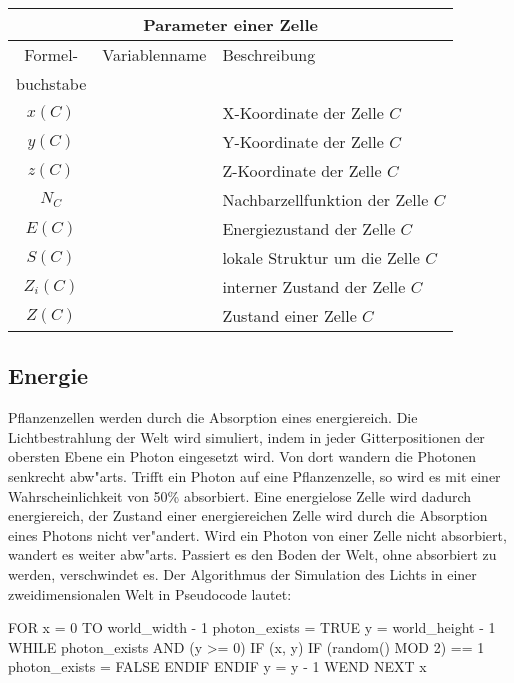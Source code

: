 \medskip
\noindent\begin{tabularx}{\linewidth}{|c|l|X|} \hline
\multicolumn{3}{|c|}{\bfseries Parameter einer Zelle} \\ \hline
Formel- & Variablenname   & Beschreibung \\
buchstabe &               & \\ \hline
$x(C)$    & & X-Koordinate der Zelle $C$ \\
$y(C)$    & & Y-Koordinate der Zelle $C$ \\
$z(C)$    & & Z-Koordinate der Zelle $C$ \\
$N_C$     & & Nachbarzellfunktion der Zelle $C$ \\
$E(C)$    & & Energiezustand der Zelle $C$ \\
$S(C)$    & & lokale Struktur um die Zelle $C$ \\
$Z_i(C)$  & & interner Zustand der Zelle $C$ \\
$Z(C)$    & & Zustand einer Zelle $C$ \\ \hline
\end{tabularx}
\medskip


\subsection{Energie}
\label{energydef}

Pflanzenzellen werden durch die Absorption eines  energiereich.
Die Lichtbestrahlung der Welt wird simuliert, indem
in jeder Gitterpositionen der obersten Ebene ein Photon eingesetzt wird.
Von dort wandern die Photonen senkrecht abw"arts. Trifft ein Photon auf
eine Pflanzenzelle, so wird es mit einer Wahrscheinlichkeit von 50\%
absorbiert. Eine energielose Zelle wird dadurch energiereich, der Zustand
einer energiereichen Zelle wird durch die Absorption eines Photons nicht
ver"andert. Wird ein Photon von einer Zelle nicht absorbiert, wandert
es weiter abw"arts. Passiert es den Boden der Welt, ohne absorbiert zu
werden, verschwindet es. Der Algorithmus der Simulation des Lichts
in einer zweidimensionalen Welt in Pseudocode lautet:

\begin{verbatimcmd}
FOR x = 0 TO world_width - 1
  photon_exists = TRUE
  y = world_height - 1
  WHILE photon_exists AND (y >= 0)
    IF  (x, y) 
      IF (random() MOD 2) == 1
        photon_exists = FALSE
      ENDIF
    ENDIF
    y = y - 1
  WEND
NEXT x
\end{verbatimcmd}


